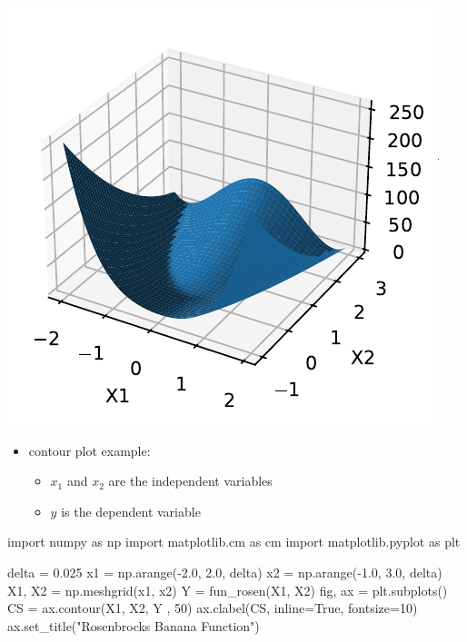 \documentclass[
  letterpaper,
  DIV=11,
  numbers=noendperiod]{scrreprt}
\newenvironment{Shaded}{\begin{snugshade}}{\end{snugshade}}
\newcommand{\DecValTok}[1]{\textcolor[rgb]{0.68,0.00,0.00}{#1}}
\newcommand{\FloatTok}[1]{\textcolor[rgb]{0.68,0.00,0.00}{#1}}
\newcommand{\ImportTok}[1]{\textcolor[rgb]{0.00,0.46,0.62}{#1}}
\newcommand{\NormalTok}[1]{\textcolor[rgb]{0.00,0.23,0.31}{#1}}
\newcommand{\OperatorTok}[1]{\textcolor[rgb]{0.37,0.37,0.37}{#1}}
\newcommand{\StringTok}[1]{\textcolor[rgb]{0.13,0.47,0.30}{#1}}
\newcommand{\VariableTok}[1]{\textcolor[rgb]{0.07,0.07,0.07}{#1}}
\providecommand{\tightlist}{%
  \setlength{\itemsep}{0pt}\setlength{\parskip}{0pt}}\usepackage{longtable,booktabs,array}
\begin{document}
\includegraphics{005_num_rsm_files/figure-pdf/cell-2-output-1.pdf}

\begin{itemize}
\tightlist
\item
  contour plot example:

  \begin{itemize}
  \tightlist
  \item
    \(x_1\) and \(x_2\) are the independent variables
  \item
    \(y\) is the dependent variable
  \end{itemize}
\end{itemize}

\begin{Shaded}
\begin{Highlighting}[]
\ImportTok{import}\NormalTok{ numpy }\ImportTok{as}\NormalTok{ np}
\ImportTok{import}\NormalTok{ matplotlib.cm }\ImportTok{as}\NormalTok{ cm}
\ImportTok{import}\NormalTok{ matplotlib.pyplot }\ImportTok{as}\NormalTok{ plt}

\NormalTok{delta }\OperatorTok{=} \FloatTok{0.025}
\NormalTok{x1 }\OperatorTok{=}\NormalTok{ np.arange(}\OperatorTok{{-}}\FloatTok{2.0}\NormalTok{, }\FloatTok{2.0}\NormalTok{, delta)}
\NormalTok{x2 }\OperatorTok{=}\NormalTok{ np.arange(}\OperatorTok{{-}}\FloatTok{1.0}\NormalTok{, }\FloatTok{3.0}\NormalTok{, delta)}
\NormalTok{X1, X2 }\OperatorTok{=}\NormalTok{ np.meshgrid(x1, x2)}
\NormalTok{Y }\OperatorTok{=}\NormalTok{ fun\_rosen(X1, X2)}
\NormalTok{fig, ax }\OperatorTok{=}\NormalTok{ plt.subplots()}
\NormalTok{CS }\OperatorTok{=}\NormalTok{ ax.contour(X1, X2, Y , }\DecValTok{50}\NormalTok{)}
\NormalTok{ax.clabel(CS, inline}\OperatorTok{=}\VariableTok{True}\NormalTok{, fontsize}\OperatorTok{=}\DecValTok{10}\NormalTok{)}
\NormalTok{ax.set\_title(}\StringTok{"Rosenbrock\textquotesingle{}s Banana Function"}\NormalTok{)}
\end{Highlighting}
\end{Shaded}
\end{document}

